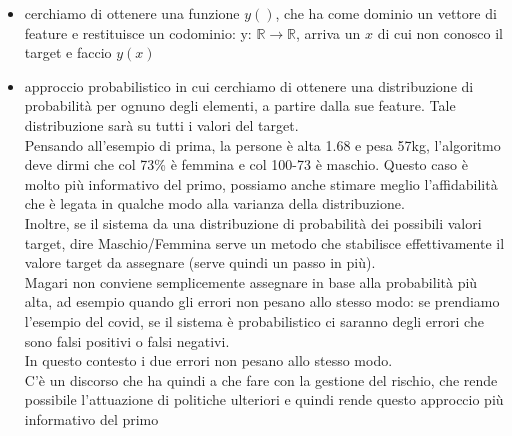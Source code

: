 \documentclass[12pt, oneside]{extbook}
\begin{document}
\begin{itemize}
	\item cerchiamo di ottenere una funzione $y()$, che ha come dominio un vettore di feature e restituisce un codominio: y: $\mathbb{R} \rightarrow \mathbb{R}$, arriva un $x$ di cui non conosco il target e faccio $y(x)$
	\item approccio probabilistico in cui cerchiamo di ottenere una distribuzione di probabilità per ognuno degli elementi, a partire dalla sue feature. Tale distribuzione sarà su tutti i valori del target.\\Pensando all'esempio di prima, la persone è alta 1.68 e pesa 57kg, l'algoritmo deve dirmi che col 73\% è femmina e col 100-73 è maschio. Questo caso è molto più informativo del primo, possiamo anche stimare meglio l'affidabilità che è legata in qualche modo alla varianza della distribuzione.\\Inoltre, se il sistema da una distribuzione di probabilità dei possibili valori target, dire Maschio/Femmina serve un metodo che stabilisce effettivamente il valore target da assegnare (serve quindi un passo in più).\\Magari non conviene semplicemente assegnare in base alla probabilità più alta, ad esempio quando gli errori non pesano allo stesso modo: se prendiamo l'esempio del covid, se il sistema è probabilistico ci saranno degli errori che sono falsi positivi o falsi negativi.\\In questo contesto i due errori non pesano allo stesso modo.\\C'è un discorso che ha quindi a che fare con la gestione del rischio, che rende possibile l'attuazione di politiche ulteriori e quindi rende questo approccio più informativo del primo
\end{itemize}
\end{document}
